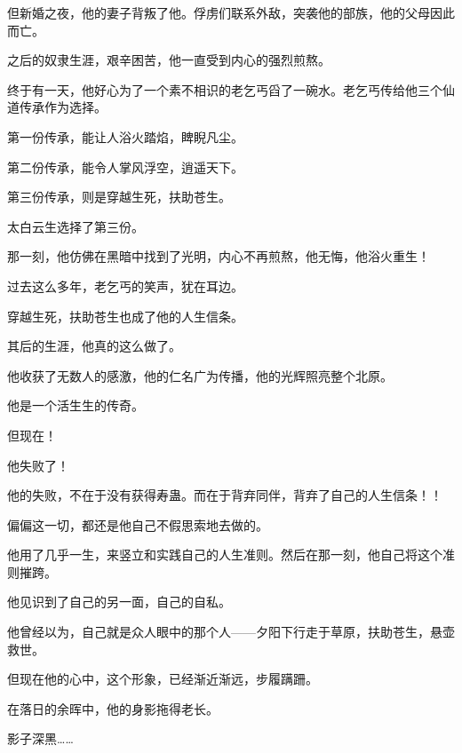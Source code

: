 \begin{this_body}
但新婚之夜，他的妻子背叛了他。俘虏们联系外敌，突袭他的部族，他的父母因此而亡。

之后的奴隶生涯，艰辛困苦，他一直受到内心的强烈煎熬。

终于有一天，他好心为了一个素不相识的老乞丐舀了一碗水。老乞丐传给他三个仙道传承作为选择。

第一份传承，能让人浴火踏焰，睥睨凡尘。

第二份传承，能令人掌风浮空，逍遥天下。

第三份传承，则是穿越生死，扶助苍生。

太白云生选择了第三份。

那一刻，他仿佛在黑暗中找到了光明，内心不再煎熬，他无悔，他浴火重生！

过去这么多年，老乞丐的笑声，犹在耳边。

穿越生死，扶助苍生也成了他的人生信条。

其后的生涯，他真的这么做了。

他收获了无数人的感激，他的仁名广为传播，他的光辉照亮整个北原。

他是一个活生生的传奇。

但现在！

他失败了！

他的失败，不在于没有获得寿蛊。而在于背弃同伴，背弃了自己的人生信条！！

偏偏这一切，都还是他自己不假思索地去做的。

他用了几乎一生，来竖立和实践自己的人生准则。然后在那一刻，他自己将这个准则摧跨。

他见识到了自己的另一面，自己的自私。

他曾经以为，自己就是众人眼中的那个人——夕阳下行走于草原，扶助苍生，悬壶救世。

但现在他的心中，这个形象，已经渐近渐远，步履蹒跚。

在落日的余晖中，他的身影拖得老长。

影子深黑……

\end{this_body}

